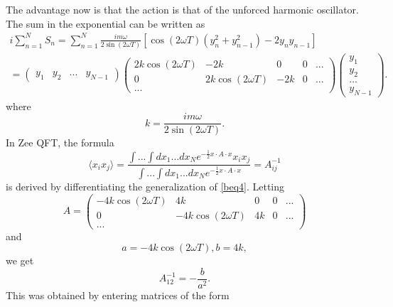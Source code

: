 The advantage now is that the action is that of the unforced harmonic oscillator. The sum in the exponential can be written as
\begin{align}
    i\sum _{n=1}^N S_{n}= \sum _{n=1}^N\frac{im\omega}{2\sin(2\omega T)}[\cos(2\omega T)(y_n^2+y_{n-1}^2)-2y_ny_{n-1}]\\=\begin{pmatrix}y_1 & y_2 & ... & y_{N-1}\end{pmatrix}\begin{pmatrix} 
    2k\cos(2\omega T) & -2k & 0 & 0 &... \\ 0 & 2k\cos(2\omega T) & -2k & 0 &... \\ ... 
    \end{pmatrix} \begin{pmatrix} y_1\\y_2\\... \\y_{N-1}
    \end{pmatrix}.
\end{align}
where 
\begin{equation}
    k=\frac{im\omega}{2\sin(2\omega T)}.
\end{equation}
In Zee QFT, the formula 
\begin{equation}
    \langle x_i x_j \rangle =\frac{\int...\int dx_1...dx_N e^{-\frac 1 2 x\cdot A \cdot x}x_ix_j}{\int...\int dx_1...dx_N e^{-\frac 1 2 x\cdot A \cdot x}}=A_{ij}^{-1}
\end{equation}
is derived by differentiating the generalization of \eqref{beq4}. Letting
\begin{equation}
    A=\begin{pmatrix} 
    -4k\cos(2\omega T) & 4k & 0 & 0 &... \\ 0 & -4k\cos(2\omega T) & 4k & 0 &... \\ ... 
    \end{pmatrix}
\end{equation}
and 
\begin{equation}
    a=-4k\cos(2\omega T), b=4k,
\end{equation}
we get
\begin{equation}
    A^{-1}_{12}=-\frac b {a^2}.
\end{equation}
This was obtained by entering matrices of the form
